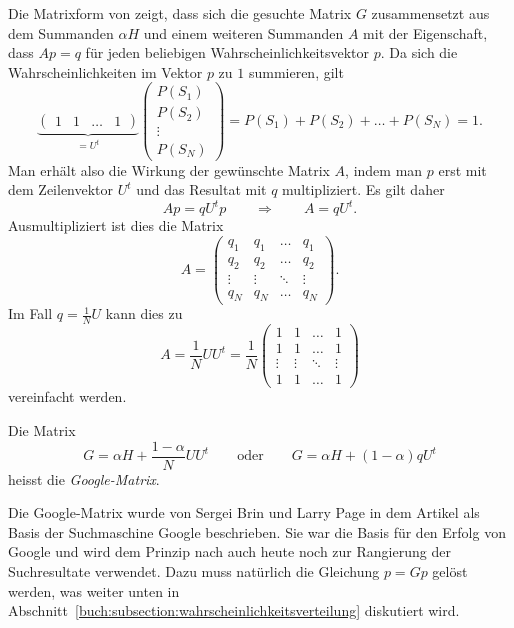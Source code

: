 Die Matrixform von
\label{buch:google:eqn:composed}
zeigt, dass sich die gesuchte Matrix $G$ zusammensetzt aus dem Summanden
$\alpha H$ und einem weiteren Summanden $A$ mit der Eigenschaft, dass
$Ap = q$ für jeden beliebigen Wahrscheinlichkeitsvektor $p$.
Da sich die Wahrscheinlichkeiten im Vektor $p$ zu $1$ summieren, gilt
\[
\underbrace{
\begin{pmatrix}
1&1&\dots&1
\end{pmatrix}
}_{\displaystyle = U^t}
\begin{pmatrix}
P(S_1)\\
P(S_2)\\
\vdots\\
P(S_N)
\end{pmatrix}
=
P(S_1)+P(S_2)+\dots+P(S_N)=1.
\]
Man erhält also die Wirkung der gewünschte Matrix $A$, indem man $p$
erst mit dem Zeilenvektor $U^t$ und das Resultat mit $q$ multipliziert.
Es gilt daher
\[
Ap = qU^tp
\qquad\Rightarrow\qquad
A=qU^t.
\]
Ausmultipliziert ist dies die Matrix
\[
A=\begin{pmatrix}
q_1&q_1&\dots&q_1\\
q_2&q_2&\dots&q_2\\
\vdots&\vdots&\ddots&\vdots\\
q_N&q_N&\dots&q_N
\end{pmatrix}.
\]
Im Fall $q=\frac1NU$ kann dies zu
\[
A
=
\frac1N UU^t
=
\frac1N
\begin{pmatrix}
1&1&\dots&1\\
1&1&\dots&1\\
\vdots&\vdots&\ddots&\vdots\\
1&1&\dots&1
\end{pmatrix}
\]
vereinfacht werden.

\begin{definition}
Die Matrix
\begin{equation}
G
=
\alpha H
+
\frac{1-\alpha}{N}
UU^t
\qquad\text{oder}\qquad
G
=
\alpha H
+
(1-\alpha)qU^t
\label{buch:wahrscheinlichkeit:eqn:google-matrix}
\end{equation}
heisst die
{\em Google-Matrix}.
%
\end{definition}

Die Google-Matrix wurde von Sergei Brin und Larry Page 
in dem Artikel \cite{BRIN1998107} als Basis der Suchmaschine
Google beschrieben.
Sie war die Basis für den Erfolg von Google und wird dem Prinzip nach
auch heute noch zur Rangierung der Suchresultate verwendet.
Dazu muss natürlich die Gleichung $p=Gp$ gelöst werden, was
weiter unten in Abschnitt~\ref{buch:subsection:wahrscheinlichkeitsverteilung}
diskutiert wird.

